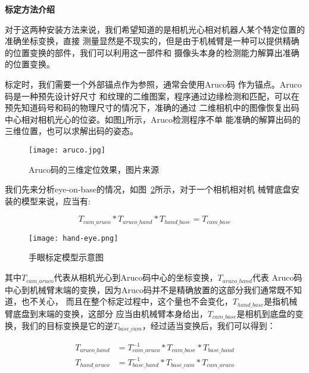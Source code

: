 \noindent \textbf{标定方法介绍}

对于这两种安装方法来说，我们希望知道的是相机光心相对机器人某个特定位置的准确坐标变换，直接
测量显然是不现实的，但是由于机械臂是一种可以提供精确的位置变换的部件，我们可以利用这一部件和
摄像头本身的检测能力解算出准确的位置变换。

标定时，我们需要一个外部锚点作为参照，通常会使用Aruco码\cite{garrido2014automatic}
作为锚点。Aruco码是一种预先设计好尺寸
和纹理的二维图案，程序通过边缘检测和匹配，可以在预先知道码号和码的物理尺寸的情况下，准确的通过
二维相机中的图像恢复出码中心相对相机光心的位姿。如图\ref{fig:aruco}所示，Aruco检测程序不单
能准确的解算出码的三维位置，也可以求解出码的姿态。

\begin{figure}[h] %
  \centering
  \texttt{[image: aruco.jpg]}
  \caption{Aruco码的三维定位效果，图片来源\cite{aruco}}
  \label{fig:aruco}
\end{figure}

我们先来分析eye-on-base的情况，如图~\ref{fig:hand_eye}所示，对于一个相机相对机
械臂底盘安装的模型来说，应当有:

\begin{equation}
  T_{cam\_aruco} * T_{aruco\_hand} * T_{hand\_base} = T_{cam\_base}
\end{equation}

\begin{figure}[h] %
  \centering
  \texttt{[image: hand-eye.png]}
  \caption{手眼标定模型示意图}
  \label{fig:hand_eye}
\end{figure}

其中$T_{cam\_aruco}$代表从相机光心到Aruco码中心的坐标变换，$T_{aruco\_hand}$代表
Aruco码中心到机械臂末端的变换，因为Aruco码并不是精确放置的这部分我们通常既不知道，也不关心，
而且在整个标定过程中，这个量也不会变化，$T_{hand\_base}$是指机械臂底盘到末端的变换，这部分
应当由机械臂本身给出，$T_{cam\_base}$是相机到底盘的变换，我们的目标变换是它的逆$T_{base\_cam}$，经过适当变换后，我们可以得到：

\begin{equation}
  \begin{aligned}
    T_{aruco\_hand} &= T_{cam\_aruco}^{-1} * T_{cam\_base} * T_{base\_hand} \\
    T_{hand\_aruco} &= T_{base\_hand}^{-1} * T_{base\_cam} * T_{cam\_aruco}
  \end{aligned}
\end{equation}

